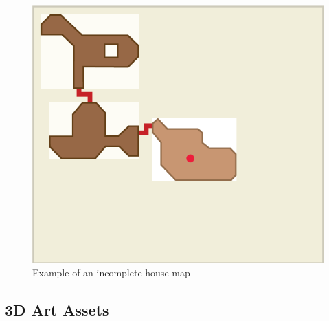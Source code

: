 \begin{figure}[htb]
	\centering\includegraphics[width=.5\linewidth]{images/RoomGeneration_IncompleteHouseMapExample}
	\caption{Example of an incomplete house map}
	\label{fig:house_map_incomplete}
\end{figure}

\clearpage
\subsection{3D Art Assets}


